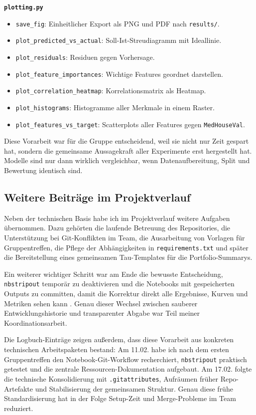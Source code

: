 \documentclass[9pt,a4paper,twocolumn,twoside]{tau-class/tau}
\begin{document}
\textbf{\texttt{plotting.py}}\par
\begin{itemize}[leftmargin=*,itemsep=0.12em,topsep=0.2em]
    \item \texttt{save\_fig}: Einheitlicher Export als PNG und PDF nach \texttt{results/}.
    \item \texttt{plot\_predicted\_vs\_actual}: Soll-Ist-Streudiagramm mit Ideallinie.
    \item \texttt{plot\_residuals}: Residuen gegen Vorhersage.
    \item \texttt{plot\_feature\_importances}: Wichtige Features geordnet darstellen.
    \item \texttt{plot\_correlation\_heatmap}: Korrelationsmatrix als Heatmap.
    \item \texttt{plot\_histograms}: Histogramme aller Merkmale in einem Raster.
    \item \texttt{plot\_features\_vs\_target}: Scatterplots aller Features gegen \texttt{MedHouseVal}.
\end{itemize}
\normalsize

Diese Vorarbeit war f\"ur die Gruppe entscheidend, weil sie nicht nur Zeit gespart hat, sondern die gemeinsame Aussagekraft aller Experimente erst hergestellt hat. Modelle sind nur dann wirklich vergleichbar, wenn Datenaufbereitung, Split und Bewertung identisch sind.

\subsection*{Weitere Beitr\"age im Projektverlauf}
Neben der technischen Basis habe ich im Projektverlauf weitere Aufgaben \"ubernommen. Dazu geh\"orten die laufende Betreuung des Repositories, die Unterst\"utzung bei Git-Konflikten im Team, die Ausarbeitung von Vorlagen f\"ur Gruppentreffen, die Pflege der Abh\"angigkeiten in \texttt{requirements.txt} und sp\"ater die Bereitstellung eines gemeinsamen Tau-Templates f\"ur die Portfolio-Summarys.

Ein weiterer wichtiger Schritt war am Ende die bewusste Entscheidung, \texttt{nbstripout} tempor\"ar zu deaktivieren und die Notebooks mit gespeicherten Outputs zu committen, damit die Korrektur direkt alle Ergebnisse, Kurven und Metriken sehen kann \cite{nbstripout}. Genau dieser Wechsel zwischen sauberer Entwicklungshistorie und transparenter Abgabe war Teil meiner Koordinationsarbeit.

Die Logbuch-Eintr\"age zeigen au\ss{}erdem, dass diese Vorarbeit aus konkreten technischen Arbeitspaketen bestand: Am 11.02. habe ich nach dem ersten Gruppentreffen den Notebook-Git-Workflow recherchiert, \texttt{nbstripout} praktisch getestet und die zentrale Ressourcen-Dokumentation aufgebaut. Am 17.02. folgte die technische Konsolidierung mit \texttt{.gitattributes}, Aufr\"aumen fr\"uher Repo-Artefakte und Stabilisierung der gemeinsamen Struktur. Genau diese fr\"uhe Standardisierung hat in der Folge Setup-Zeit und Merge-Probleme im Team reduziert.
\end{document}
